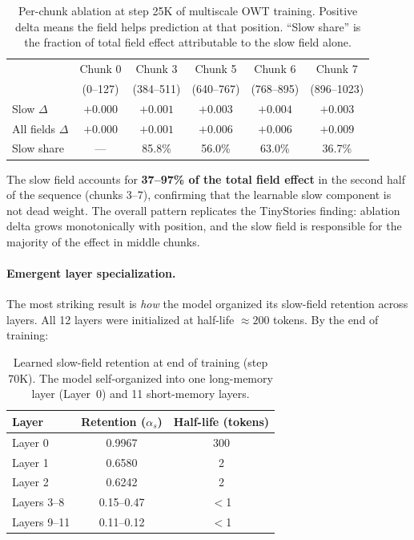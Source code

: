 \documentclass[11pt,a4paper]{article}
\newcommand{\retain}{\alpha}
\begin{document}
\begin{table}[h]
\centering
\caption{Per-chunk ablation at step 25K of multiscale OWT training.
  Positive delta means the field helps prediction at that position.
  ``Slow share'' is the fraction of total field effect attributable
  to the slow field alone.}
\label{tab:owt-chunk-ablation}
\begin{tabular}{@{}lccccc@{}}
\toprule
& Chunk 0 & Chunk 3 & Chunk 5 & Chunk 6 & Chunk 7 \\
& (0--127) & (384--511) & (640--767) & (768--895) & (896--1023) \\
\midrule
Slow $\Delta$ & $+0.000$ & $+0.001$ & $+0.003$ & $+0.004$ & $+0.003$ \\
All fields $\Delta$ & $+0.000$ & $+0.001$ & $+0.006$ & $+0.006$ & $+0.009$ \\
Slow share & --- & 85.8\% & 56.0\% & 63.0\% & 36.7\% \\
\bottomrule
\end{tabular}
\end{table}

The slow field accounts for \textbf{37--97\% of the total field effect}
in the second half of the sequence (chunks 3--7), confirming that the
learnable slow component is not dead weight.  The overall pattern
replicates the TinyStories finding: ablation delta grows monotonically
with position, and the slow field is responsible for the majority of
the effect in middle chunks.

\paragraph{Emergent layer specialization.}
The most striking result is \emph{how} the model organized its
slow-field retention across layers.  All 12 layers were initialized
at half-life $\approx 200$ tokens.  By the end of training:

\begin{table}[h]
\centering
\caption{Learned slow-field retention at end of training (step 70K).
  The model self-organized into one long-memory layer (Layer~0) and
  11 short-memory layers.}
\label{tab:owt-retention}
\begin{tabular}{@{}lcc@{}}
\toprule
Layer & Retention ($\retain_s$) & Half-life (tokens) \\
\midrule
Layer 0 & 0.9967 & 300 \\
Layer 1 & 0.6580 & 2 \\
Layer 2 & 0.6242 & 2 \\
Layers 3--8 & 0.15--0.47 & $<$1 \\
Layers 9--11 & 0.11--0.12 & $<$1 \\
\bottomrule
\end{tabular}
\end{table}
\end{document}
